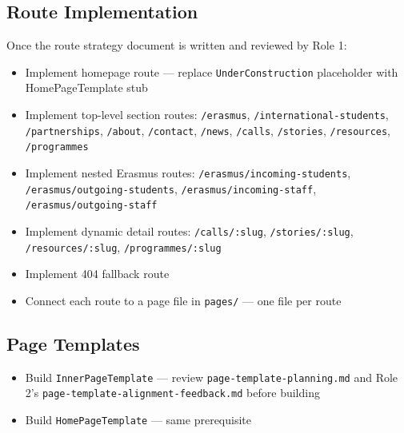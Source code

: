 \documentclass[12pt,a4paper]{article}
\begin{document}
\subsection{Route Implementation}

Once the route strategy document is written and reviewed by Role 1:

\begin{itemize}
    \item[$\square$] Implement homepage route --- replace \texttt{UnderConstruction} placeholder with HomePageTemplate stub
    \item[$\square$] Implement top-level section routes: \texttt{/erasmus}, \texttt{/international-students}, \texttt{/partnerships}, \texttt{/about}, \texttt{/contact}, \texttt{/news}, \texttt{/calls}, \texttt{/stories}, \texttt{/resources}, \texttt{/programmes}
    \item[$\square$] Implement nested Erasmus routes: \texttt{/erasmus/incoming-students}, \texttt{/erasmus/outgoing-students}, \texttt{/erasmus/incoming-staff}, \texttt{/erasmus/outgoing-staff}
    \item[$\square$] Implement dynamic detail routes: \texttt{/calls/:slug}, \texttt{/stories/:slug}, \texttt{/resources/:slug}, \texttt{/programmes/:slug}
    \item[$\square$] Implement 404 fallback route
    \item[$\square$] Connect each route to a page file in \texttt{pages/} --- one file per route
\end{itemize}

\subsection{Page Templates}

\begin{itemize}
    \item[$\square$] Build \texttt{InnerPageTemplate} --- review \texttt{page-template-planning.md} and Role 2's \texttt{page-template-alignment-feedback.md} before building
    \item[$\square$] Build \texttt{HomePageTemplate} --- same prerequisite
\end{itemize}

\end{document}
